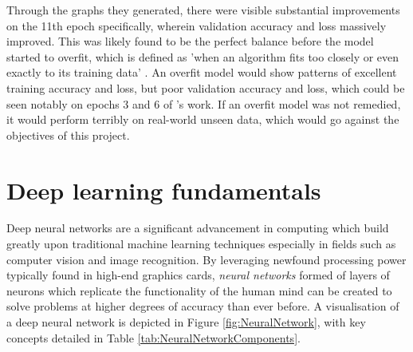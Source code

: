 \documentclass[12pt]{report}
\begin{document}
\noindent Through the graphs they generated, there were visible substantial improvements on the 11th epoch specifically, wherein validation 
accuracy and loss massively improved. This was likely found to be the perfect balance before the model started to overfit, which is defined 
as 'when an algorithm fits too closely or even exactly to its training data' \autocite{ibmWhatOverfittingIBM2021}. An overfit model would 
show patterns of excellent training accuracy and loss, but poor validation accuracy and loss, which could be seen notably on epochs 3 and 6
of \textcite{mathurPneumoniaDetectionUsing2020}'s work. If an overfit model was not remedied, it would perform terribly on real-world unseen 
data, which would go against the objectives of this project.  


\chapter{Deep learning fundamentals}




Deep neural networks are a significant advancement in computing which build greatly upon traditional 
machine learning techniques especially in fields such as computer vision and image recognition. By leveraging newfound processing power 
typically found in high-end graphics cards, \textit{neural networks} formed of layers of neurons which replicate the functionality of 
the human mind can be created to solve problems at higher degrees of accuracy than ever before. A visualisation of a deep neural network 
is depicted in Figure \ref{fig:NeuralNetwork}, with key concepts detailed in Table \ref{tab:NeuralNetworkComponents}.
\end{document}
